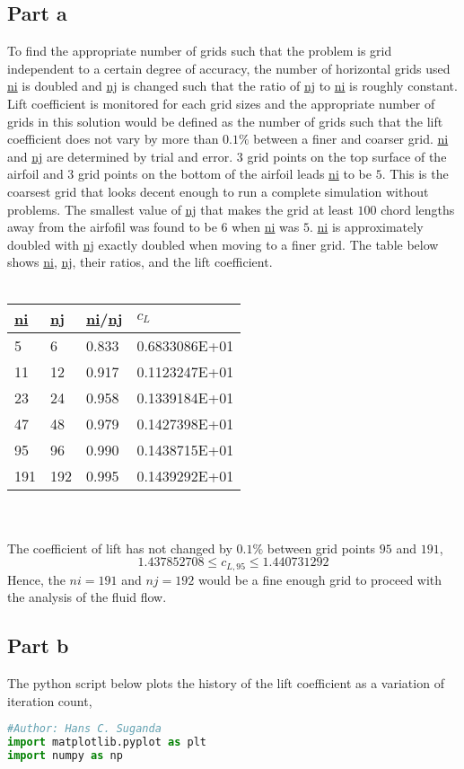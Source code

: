 \documentclass[a4paper, 12pt]{report}
\def\tabsize{2.4cm}
\def\ltabsize{3.7cm}
\begin{document}
\begin{center}
\subsection{Part a}
To find the appropriate number of grids such that the problem is grid independent to a certain degree of accuracy, the number of horizontal grids used \url{ni} is doubled and \url{nj} is changed such that the ratio of \url{nj} to \url{ni} is roughly constant. Lift coefficient is monitored for each grid sizes and the appropriate number of grids in this solution would be defined as the number of grids such that the lift coefficient does not vary by more than $0.1\%$ between a finer and coarser grid. \url{ni} and \url{nj} are determined by trial and error. $3$ grid points on the top surface of the airfoil and $3$ grid points on the bottom of the airfoil leads \url{ni} to be $5$. This is the coarsest grid that looks decent enough to run a complete simulation without problems. The smallest value of \url{nj} that makes the grid at least $100$ chord lengths away from the airfofil was found to be $6$ when \url{ni} was $5$. \url{ni} is approximately doubled with \url{nj} exactly doubled when moving to a finer grid. The table below shows \url{ni}, \url{nj}, their ratios, and the lift coefficient.
\\~\\\begin{tabular}{|m{\tabsize}|m{\tabsize}|m{\tabsize}|m{\ltabsize}|}
\hline 
\url{ni} & \url{nj} & \url{ni}/\url{nj} & $c_L$ \\ \hline
5 & 6 & 0.833 & 0.6833086E+01 \\ \hline
11 & 12 & 0.917 & 0.1123247E+01 \\ \hline
23 & 24 & 0.958 & 0.1339184E+01 \\ \hline
47 & 48 & 0.979 & 0.1427398E+01 \\ \hline
95 & 96 & 0.990 & 0.1438715E+01 \\ \hline
191 & 192 & 0.995 & 0.1439292E+01 \\ \hline
\end{tabular}
\\~\\The coefficient of lift has not changed by $0.1\%$ between grid points $95$ and $191$,
$$1.437852708 \leq c_{L,95}\leq 1.440731292$$
Hence, the $ni = 191$ and $nj = 192$ would be a fine enough grid to proceed with the analysis of the fluid flow.
\subsection{Part b}
The python script below plots the history of the lift coefficient as a variation of iteration count,
\begin{lstlisting}[language=python]
#Author: Hans C. Suganda
import matplotlib.pyplot as plt
import numpy as np


\end{lstlisting}
\end{center}
\end{document}
